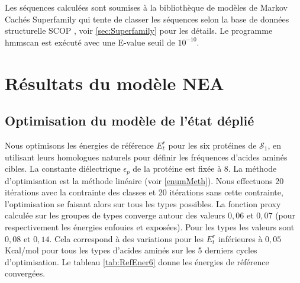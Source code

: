 Les séquences calculées sont soumises à la bibliothèque de modèles de Markov Cachés Superfamily \cite{Gough01, Wilson07}  qui tente de classer les séquences selon la base de données structurelle SCOP \cite{Andreeva04}, voir \ref{sec:Superfamily} pour les détails. Le programme hmmscan est exécuté avec une E-value seuil de $10^{-10}$. 

\section {Résultats du modèle NEA}
\label{sectionNEA} 
\subsection{Optimisation du modèle de l'état déplié}

Nous optimisons les énergies de référence $E_t^r$ pour les six protéines de $\mathcal{S}_1$, en utilisant leurs homologues naturels pour définir les fréquences d'acides aminés cibles. La constante diélectrique $\epsilon_p$ de la protéine est fixée à $8$. La méthode d'optimisation est la méthode linéaire (voir \ref{enumMeth}). Nous effectuons 20 itérations avec la contrainte des classes et 20 itérations sans cette contrainte, l'optimisation se faisant alors sur tous les types possibles. La fonction proxy calculée sur les groupes de types converge autour des valeurs $0,06$ et $0,07$ (pour respectivement les énergies enfouies et exposées). Pour les types les valeurs sont $0,08$ et $0,14$. Cela correspond à des variations  pour les $E_t^r$ inférieures à $0,05$ Kcal/mol pour tous les types d'acides aminés sur les 5 derniers cycles d'optimisation. Le tableau \ref{tab:RefEner6} donne les énergies de référence convergées.

